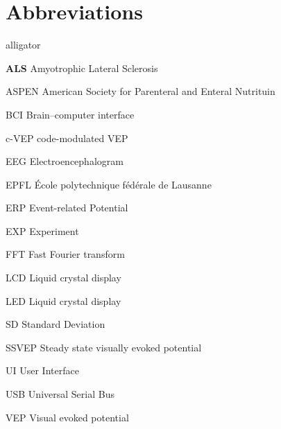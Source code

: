 \chapter{Abbreviations}
\begin{labeling}{alligator}
	\item[\textbf{ALS}]	Amyotrophic Lateral Sclerosis
	\item[ASPEN] American Society for Parenteral and Enteral Nutrituin
	\item[BCI] Brain–computer interface
	\item[c-VEP] code-modulated VEP
	\item[EEG] Electroencephalogram
	\item[EPFL] École polytechnique fédérale de Lausanne
	\item[ERP] Event-related Potential
	\item[EXP] Experiment
	\item[FFT] Fast Fourier transform
	\item[LCD] Liquid crystal display
	\item[LED] Liquid crystal display
	\item[SD] Standard Deviation
	\item[SSVEP] Steady state visually evoked potential
	\item[UI] User Interface
	\item[USB] Universal Serial Bus
	\item[VEP] Visual evoked potential
	
\end{labeling}